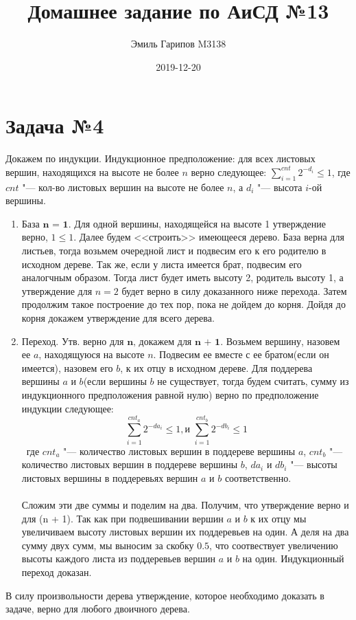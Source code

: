 \documentclass{article}
\title{Домашнее задание по АиСД №13}
\date{2019-12-20}
\author{Эмиль Гарипов M3138}
\begin{document}

\maketitle
\newpage
{}

\section*{Задача №4}
Докажем по индукции. 
Индукционное предположение: 
для всех листовых вершин, находящихся на высоте не более $n$ верно следующее: $\sum_{i = 1}^{cnt}{2^{-d_i}} \leq 1$, где $cnt$ "--- кол-во листовых вершин на высоте не более $n$, а $d_i$ "--- высота $i$-ой вершины. 

\begin{enumerate}
	\item $\textbf{База n = 1}$.
	Для одной вершины, находящейся на высоте 1 утверждение верно, $ 1 \leq 1$.
	Далее будем <<строить>> имеющееся дерево. База верна для листьев, тогда возьмем очередной лист и подвесим его к его родителю в исходном дереве. Так же, если у листа имеется брат, подвесим его аналогчным образом. Тогда лист будет иметь высоту 2, родитель высоту 1, а утверждение для $n = 2$ будет верно в силу доказанного ниже перехода. Затем продолжим такое построение до тех пор, пока не дойдем до корня. Дойдя до корня докажем утверждение для всего дерева.
	\item $\textbf{Переход. Утв. верно для n, докажем для n + 1}$. Возьмем вершину, назовем ее $a$, находящуюся на высоте $n$. Подвесим ее вместе с ее братом(если он имеется), назовем его $b$, к их отцу в исходном дереве. Для поддерева вершины $a$ и $b$(если вершины $b$ не существует, тогда будем считать, сумму из индукционного предположения равной нулю) верно по предположение индукции следующее:
	\begin{equation}
	\sum_{i = 1}^{cnt_a}{2^{-da_i}} \leq 1 , \text{и } \sum_{i = 1}^{cnt_b}{2^{-db_i}} \leq 1
	\end{equation}\ 
	где $cnt_a$ "--- количество листовых вершин в поддереве вершины $a$, $cnt_b$ "--- количество листовых вершин в поддереве вершины $b$, $da_i$ и $db_i$ "--- высоты листовых вершины в поддеревьях вершин $a$ и $b$ соответственно.\\\\
	Сложим эти две суммы и поделим на два. Получим, что утверждение верно и для (n + 1). Так как при подвешивании вершин $a$ и $b$ к их отцу мы увеличиваем высоту листовых вершин их поддеревьев на один. А деля на два сумму двух сумм, мы выносим за скобку $0.5$, что соотвествует увеличению высоты каждого листа из поддеревьев вершин $a$ и $b$ на один. Индукционный переход доказан.
\end{enumerate}
В силу произвольности дерева утверждение, которое необходимо доказать в задаче, верно для любого двоичного дерева.
\end{document}
